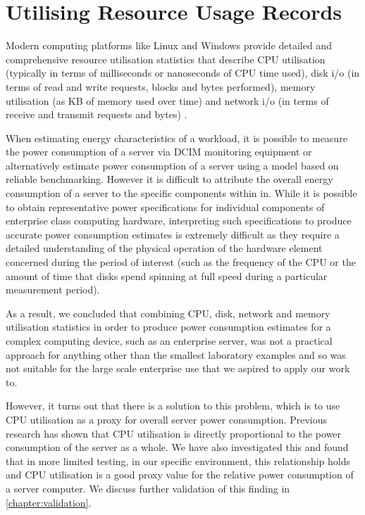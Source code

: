 \section{Utilising Resource Usage Records} \label{sec:utilisingresourceusage}

Modern computing platforms like Linux and Windows provide detailed and comprehensive resource utilisation statistics that describe CPU utilisation (typically in terms of milliseconds or nanoseconds of CPU time used), disk i/o (in terms of read and write requests, blocks and bytes performed), memory utilisation (as KB of memory used over time) and network i/o (in terms of receive and transmit requests and bytes) \cite{unix_sar_command, windows_performance_monitor}.

When estimating energy characteristics of a workload, it is possible to measure the power consumption of a server via DCIM monitoring equipment or alternatively estimate power consumption of a server using a model based on reliable benchmarking.  However it is difficult to attribute the overall energy consumption of a server to the specific components within in.  While it is possible to obtain representative power specifications \cite{hitachi_drive_data_sheet} for individual components of enterprise class computing hardware, interpreting such specifications to produce accurate power consumption estimates is extremely difficult as they require a detailed understanding of the physical operation of the hardware element concerned during the period of interest (such as the frequency of the CPU or the amount of time that disks spend spinning at full speed during a particular measurement period).

As a result, we concluded that combining CPU, disk, network and memory utilisation statistics in order to produce power consumption estimates for a complex computing device, such as an enterprise server, was not a practical approach for anything other than the smallest laboratory examples and so was not suitable for the large scale enterprise use that we aspired to apply our work to.

However, it turns out that there is a solution to this problem, which is to use CPU utilisation as a proxy for overall server power consumption.  Previous research \cite{bashroush2018_hardwarerefresh} has shown that CPU utilisation is directly proportional to the power consumption of the server as a whole.  We have also investigated this and found that in more limited testing, in our specific environment, this relationship holds and CPU utilisation is a good proxy value for the relative power consumption of a server computer.  We discuss further validation of this finding in \cref{chapter:validation}.

